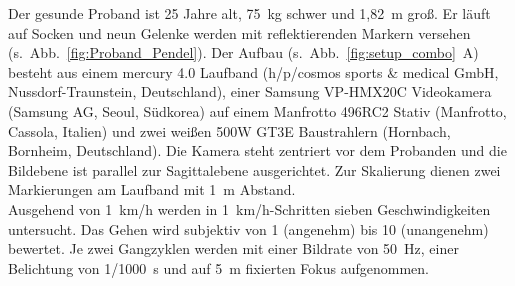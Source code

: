Der gesunde Proband ist 25 Jahre alt, 75~kg schwer und 1,82~m groß. Er läuft auf Socken und neun Gelenke werden mit reflektierenden Markern versehen (s.~Abb.~\ref{fig:Proband_Pendel}). Der Aufbau (s.~Abb.~\ref{fig:setup_combo}~A) besteht aus einem mercury 4.0 Laufband (h/p/cosmos sports \& medical GmbH, Nussdorf-Traunstein, Deutschland), einer Samsung VP-HMX20C Videokamera (Samsung AG, Seoul, Südkorea) auf einem Manfrotto 496RC2 Stativ (Manfrotto, Cassola, Italien) und zwei weißen 500W GT3E Baustrahlern (Hornbach, Bornheim, Deutschland). Die Kamera steht zentriert vor dem Probanden und die Bildebene ist parallel zur Sagittalebene ausgerichtet. Zur Skalierung dienen zwei Markierungen am Laufband mit 1~m Abstand.\\
Ausgehend von 1~km/h werden in 1~km/h-Schritten sieben Geschwindigkeiten untersucht. Das Gehen wird subjektiv von 1 (angenehm) bis 10 (unangenehm) bewertet. Je zwei Gangzyklen werden mit einer Bildrate von 50~Hz, einer Belichtung von 1/1000~s und auf 5~m fixierten Fokus aufgenommen.\\

